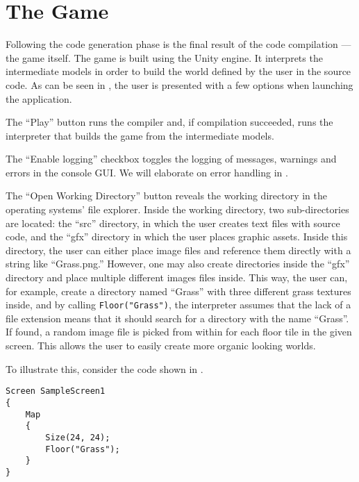 \section{The Game} \label{sec:Interpreter}
Following the code generation phase is the final result of the code compilation — the game itself. 
The game is built using the Unity engine. It interprets the intermediate models in order to build the world defined by the user in the \dazel{} source code. As can be seen in , the user is presented with a few options when launching the application.

 
The ``Play'' button runs the \dazel{} compiler and, if compilation succeeded, runs the interpreter that builds the game from the intermediate models. 


The ``Enable logging'' checkbox toggles the logging of messages, warnings and errors in the console GUI. We will elaborate on error handling in .


The ``Open Working Directory'' button reveals the working directory in the operating systems' file explorer.
Inside the working directory, two sub-directories are located: the ``src'' directory, in which the user creates text files with source code, and the ``gfx'' directory in which the user places graphic assets. Inside this directory, the user can either place image files and reference them directly with a string like ``Grass.png.'' However, one may also create directories inside the ``gfx'' directory and place multiple different images files inside. This way, the user can, for example, create a directory named ``Grass'' with three different grass textures inside, and by calling \texttt{Floor("Grass")}, the interpreter assumes that the lack of a file extension means that it should search for a directory with the name ``Grass''. If found, a random image file is picked from within for each floor tile in the given screen. This allows the user to easily create more organic looking worlds.


To illustrate this, consider the \dazel{} code shown in .
\begin{lstlisting}[language=CSharp, caption={}, label={lst:DazelGrassExample},escapechar=|]
Screen SampleScreen1 
{
	Map 
	{
		Size(24, 24);
		Floor("Grass");
	}
}
\end{lstlisting}

